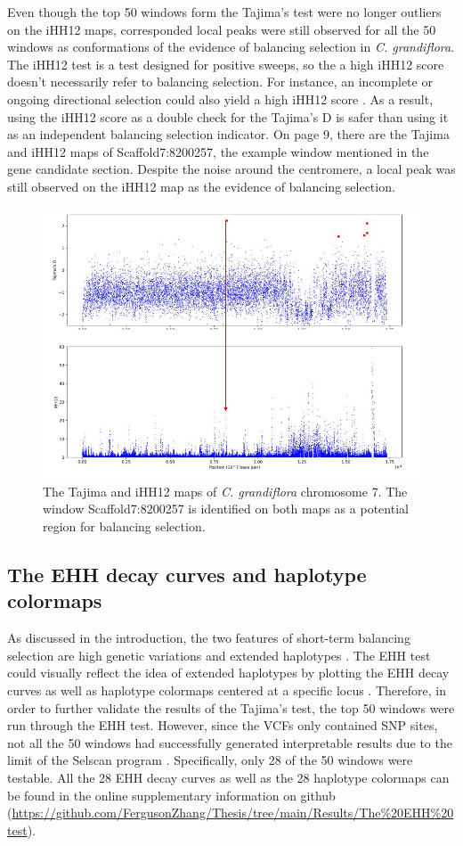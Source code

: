 Even though the top 50 windows form the Tajima’s test were no longer outliers on the iHH12 maps, corresponded local peaks were still observed for all the 50 windows as conformations of the evidence of balancing selection in \emph{C. grandiflora}. The iHH12 test is a test designed for positive sweeps, so the a high iHH12 score doesn’t necessarily refer to balancing selection. For instance, an incomplete or ongoing directional selection could also yield a high iHH12 score \citep{RN16}. As a result, using the iHH12 score as a double check for the Tajima’s D is safer than using it as an independent balancing selection indicator. On page 9, there are the Tajima and iHH12 maps of Scaffold7:8200257, the example window mentioned in the gene candidate section. Despite the noise around the centromere, a local peak was still observed on the iHH12 map as the evidence of balancing selection.

\begin{figure}[h!]
    \centering
    \includegraphics[scale=0.8]{figs/4.JPG}
    \caption{The Tajima and iHH12 maps of \emph{C. grandiflora} chromosome 7. The window Scaffold7:8200257 is identified on both maps as a potential region for balancing selection.}
    \label{fig:4}
\end{figure}

\subsection{The EHH decay curves and haplotype colormaps}
As discussed in the introduction, the two features of short-term balancing selection are high genetic variations and extended haplotypes \citep{RN2}. The EHH test could visually reflect the idea of extended haplotypes by plotting the EHH decay curves as well as haplotype colormaps centered at a specific locus \citep{RN14}. Therefore, in order to further validate the results of the Tajima’s test, the top 50 windows were run through the EHH test. However, since the VCFs only contained SNP sites, not all the 50 windows had successfully generated interpretable results due to the limit of the Selscan program \citep{RN15}. Specifically, only 28 of the 50 windows were testable. All the 28 EHH decay curves as well as the 28 haplotype colormaps can be found in the online supplementary information on github (\url{https://github.com/FergusonZhang/Thesis/tree/main/Results/The\%20EHH\%20test}).

